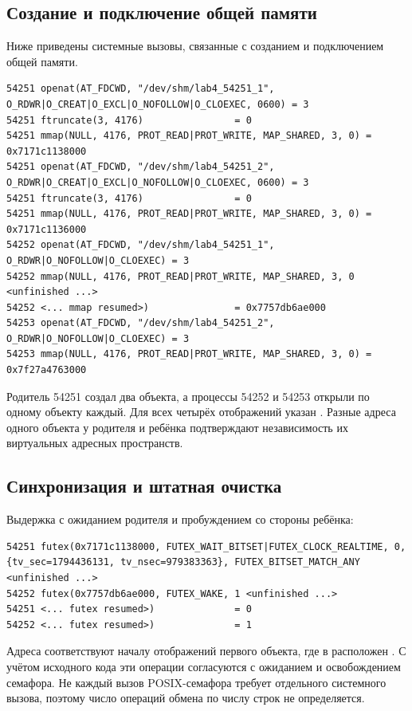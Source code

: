\documentclass[12pt,a4paper,oneside]{article}
\newcommand{\code}[1]{\texttt{\detokenize{#1}}}
\begin{document}
\subsection{Создание и подключение общей памяти}
Ниже приведены системные вызовы, связанные с созданием и подключением общей памяти.
\begin{lstlisting}
54251 openat(AT_FDCWD, "/dev/shm/lab4_54251_1", O_RDWR|O_CREAT|O_EXCL|O_NOFOLLOW|O_CLOEXEC, 0600) = 3
54251 ftruncate(3, 4176)                = 0
54251 mmap(NULL, 4176, PROT_READ|PROT_WRITE, MAP_SHARED, 3, 0) = 0x7171c1138000
54251 openat(AT_FDCWD, "/dev/shm/lab4_54251_2", O_RDWR|O_CREAT|O_EXCL|O_NOFOLLOW|O_CLOEXEC, 0600) = 3
54251 ftruncate(3, 4176)                = 0
54251 mmap(NULL, 4176, PROT_READ|PROT_WRITE, MAP_SHARED, 3, 0) = 0x7171c1136000
54252 openat(AT_FDCWD, "/dev/shm/lab4_54251_1", O_RDWR|O_NOFOLLOW|O_CLOEXEC) = 3
54252 mmap(NULL, 4176, PROT_READ|PROT_WRITE, MAP_SHARED, 3, 0 <unfinished ...>
54252 <... mmap resumed>)               = 0x7757db6ae000
54253 openat(AT_FDCWD, "/dev/shm/lab4_54251_2", O_RDWR|O_NOFOLLOW|O_CLOEXEC) = 3
54253 mmap(NULL, 4176, PROT_READ|PROT_WRITE, MAP_SHARED, 3, 0) = 0x7f27a4763000
\end{lstlisting}
Родитель 54251 создал два объекта, а процессы 54252 и 54253 открыли по одному объекту каждый. Для всех четырёх отображений указан \code{MAP_SHARED}. Разные адреса одного объекта у родителя и ребёнка подтверждают независимость их виртуальных адресных пространств.

\subsection{Синхронизация и штатная очистка}
Выдержка с ожиданием родителя и пробуждением со стороны ребёнка:
\begin{lstlisting}
54251 futex(0x7171c1138000, FUTEX_WAIT_BITSET|FUTEX_CLOCK_REALTIME, 0, {tv_sec=1794436131, tv_nsec=979383363}, FUTEX_BITSET_MATCH_ANY <unfinished ...>
54252 futex(0x7757db6ae000, FUTEX_WAKE, 1 <unfinished ...>
54251 <... futex resumed>)              = 0
54252 <... futex resumed>)              = 1
\end{lstlisting}
Адреса соответствуют началу отображений первого объекта, где в \code{SharedData} расположен \code{can_write}. С учётом исходного кода эти операции согласуются с ожиданием и освобождением семафора. Не каждый вызов POSIX-семафора требует отдельного системного вызова, поэтому число операций обмена по числу строк \code{futex} не определяется.
\end{document}
